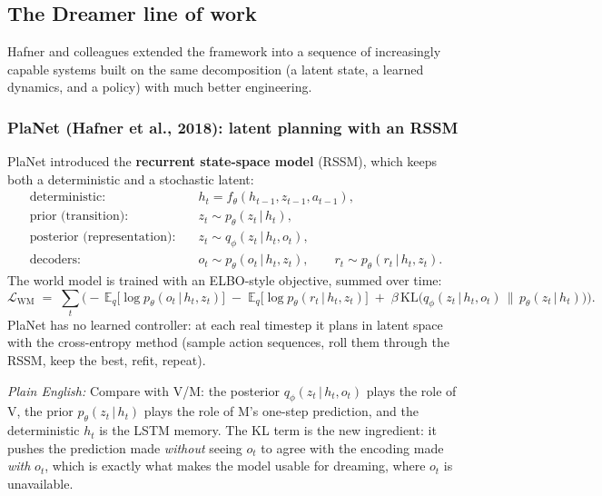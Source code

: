 \documentclass[11pt]{article}
\newcommand{\E}{\mathbb{E}}
\newcommand{\KL}{\mathrm{KL}}
\newcommand{\given}{\,\vert\,}
\theoremstyle{remark}
\newcommand{\plain}[1]{\medskip\noindent\textit{Plain English:} #1\medskip}
\begin{document}
\subsection{The Dreamer line of work}

Hafner and colleagues extended the framework into a sequence of increasingly capable systems built on the same decomposition (a latent state, a learned dynamics, and a policy) with much better engineering.

\subsubsection*{PlaNet (Hafner et al., 2018): latent planning with an RSSM}

PlaNet introduced the \textbf{recurrent state-space model} (RSSM), which keeps both a deterministic and a stochastic latent:
\begin{align}
  \text{deterministic:} \quad & h_t = f_\theta(h_{t-1}, z_{t-1}, a_{t-1}), \label{eq:rssm-det}\\
  \text{prior (transition):} \quad & z_t \sim p_\theta(z_t \given h_t), \label{eq:rssm-prior}\\
  \text{posterior (representation):} \quad & z_t \sim q_\phi(z_t \given h_t, o_t), \label{eq:rssm-post}\\
  \text{decoders:} \quad & o_t \sim p_\theta(o_t \given h_t, z_t), \qquad r_t \sim p_\theta(r_t \given h_t, z_t). \label{eq:rssm-dec}
\end{align}
The world model is trained with an ELBO-style objective, summed over time:
\begin{equation}
  \mathcal L_{\text{WM}} \;=\; \sum_t \Big(
    -\,\E_{q}\big[\log p_\theta(o_t\given h_t,z_t)\big]
    \;-\;\E_{q}\big[\log p_\theta(r_t\given h_t,z_t)\big]
    \;+\;\beta\,\KL\!\big(q_\phi(z_t\given h_t,o_t)\,\|\,p_\theta(z_t\given h_t)\big)
  \Big).
  \label{eq:rssm-loss}
\end{equation}
PlaNet has no learned controller: at each real timestep it plans in latent space with the cross-entropy method (sample action sequences, roll them through the RSSM, keep the best, refit, repeat).

\plain{Compare with V/M: the posterior $q_\phi(z_t\given h_t,o_t)$ plays the role of V, the prior $p_\theta(z_t\given h_t)$ plays the role of M's one-step prediction, and the deterministic $h_t$ is the LSTM memory. The KL term is the new ingredient: it pushes the prediction made \emph{without} seeing $o_t$ to agree with the encoding made \emph{with} $o_t$, which is exactly what makes the model usable for dreaming, where $o_t$ is unavailable.}
\end{document}
